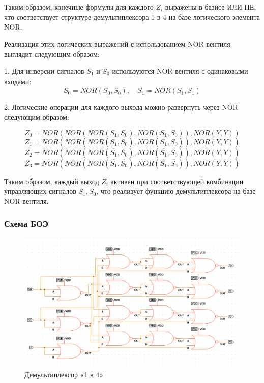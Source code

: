 Таким образом, конечные формулы для каждого \( Z_i \) выражены в базисе ИЛИ-НЕ, что соответствует структуре демультиплексора 1 в 4 на базе логического элемента NOR.

Реализация этих логических выражений с использованием NOR-вентиля выглядит следующим образом:

1. Для инверсии сигналов \( S_1 \) и \( S_0 \) используются NOR-вентиля с одинаковыми входами:
\[
	\overline{S_0} = NOR(S_0, S_0), \quad \overline{S_1} = NOR(S_1, S_1)
\]

2. Логические операции для каждого выхода можно развернуть через NOR следующим образом:

\[
	Z_0 = NOR(NOR(NOR(S_1, S_0), NOR(S_1, S_0)), NOR(Y, Y))
\]
\[
	Z_1 = NOR(NOR(NOR(S_1, \overline{S_0}), NOR(S_1, \overline{S_0})) , NOR(Y, Y))
\]
\[
	Z_2 = NOR(NOR(NOR(\overline{S_1}, S_0), NOR(\overline{S_1}, S_0)) , NOR(Y, Y))
\]
\[
	Z_3 = NOR(NOR(NOR(\overline{S_1}, \overline{S_0}), NOR(\overline{S_1}, \overline{S_0})) , NOR(Y, Y))
\]

Таким образом, каждый выход \( Z_i \) активен при соответствующей комбинации управляющих сигналов \( S_1, S_0 \), что реализует функцию демультиплексора на базе NOR-вентиля.

\subsubsection{Схема БОЭ}

\begin{figure}[H]
	\centering
	\includegraphics[width=1\textwidth]{../data/demultiplexer_1_to_4}
	\caption{Демультиплексор «1 в 4»}
\end{figure}

